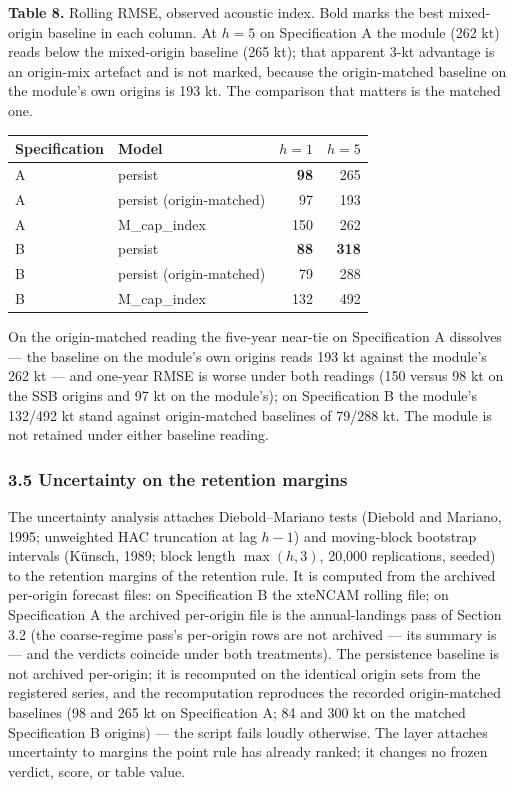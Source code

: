 \documentclass[11pt]{article}
\begin{document}
\textbf{Table 8.} Rolling RMSE, observed acoustic index. Bold marks the
best mixed-origin baseline in each column. At \(h=5\) on Specification A
the module (262 kt) reads below the mixed-origin baseline (265 kt); that
apparent 3-kt advantage is an origin-mix artefact and is not marked,
because the origin-matched baseline on the module's own origins is
193 kt. The comparison that matters is the matched one.

\begin{longtable}[]{@{}llrr@{}}
\toprule\noalign{}
Specification & Model & \(h=1\) & \(h=5\) \\
\midrule\noalign{}
\endhead
\bottomrule\noalign{}
\endlastfoot
A & persist & \textbf{98} & 265 \\
A & persist (origin-matched) & 97 & 193 \\
A & M\_cap\_index & 150 & 262 \\
B & persist & \textbf{88} & \textbf{318} \\
B & persist (origin-matched) & 79 & 288 \\
B & M\_cap\_index & 132 & 492 \\
\end{longtable}

On the origin-matched reading the five-year near-tie on Specification A
dissolves --- the baseline on the module's own origins reads 193 kt
against the module's 262 kt --- and one-year RMSE is worse under both
readings (150 versus 98 kt on the SSB origins and 97 kt on the
module's); on Specification B the module's 132/492 kt stand against
origin-matched baselines of 79/288 kt. The module is not retained under
either baseline reading.

\subsubsection{3.5 Uncertainty on the retention
margins}\label{uncertainty-on-the-retention-margins}

The uncertainty analysis attaches Diebold--Mariano tests (Diebold
and Mariano, 1995; unweighted HAC truncation at lag \(h-1\)) and
moving-block bootstrap intervals (K\"unsch, 1989; block length
\(\max(h,3)\), 20,000 replications, seeded) to the retention margins of
the retention rule. It is computed from the archived per-origin forecast
files: on Specification B the xteNCAM rolling file; on Specification A
the archived per-origin file is the annual-landings pass of Section 3.2
(the coarse-regime pass's per-origin rows are not archived --- its
summary is --- and the verdicts coincide under both treatments). The
persistence baseline is not archived per-origin; it is recomputed on the
identical origin sets from the registered series, and the recomputation
reproduces the recorded origin-matched baselines (98 and 265 kt on
Specification A; 84 and 300 kt on the matched Specification B origins)
--- the script fails loudly otherwise. The layer attaches uncertainty to
margins the point rule has already ranked; it changes no frozen verdict,
score, or table value.
\end{document}
